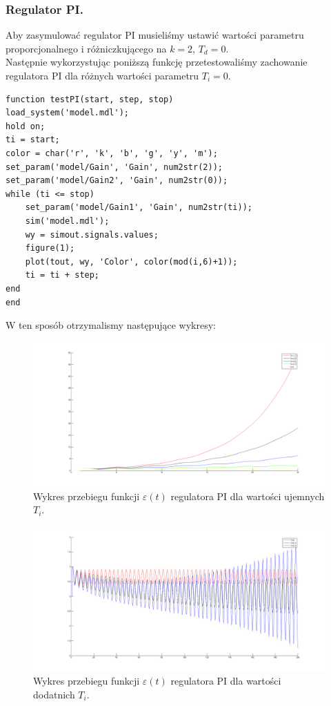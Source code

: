 \documentclass[a4paper,10pt]{article}
\begin{document}
\subsubsection{Regulator PI.}\label{sec:regPI}
Aby zasymulować regulator PI musieliśmy ustawić wartości parametru proporcjonalnego i różniczkującego na $k=2$, $T_{d}=0$. \\
Następnie wykorzystując poniższą funkcję przetestowaliśmy zachowanie regulatora PI dla różnych wartości parametru $T_{i}=0$. \\
\begin{lstlisting}[caption=Funkcja testująca regulator PI.]
function testPI(start, step, stop)
load_system('model.mdl');
hold on;
ti = start;
color = char('r', 'k', 'b', 'g', 'y', 'm');
set_param('model/Gain', 'Gain', num2str(2));
set_param('model/Gain2', 'Gain', num2str(0));
while (ti <= stop)
    set_param('model/Gain1', 'Gain', num2str(ti));
    sim('model.mdl');
    wy = simout.signals.values;
    figure(1);
    plot(tout, wy, 'Color', color(mod(i,6)+1));
    ti = ti + step;
end
end
\end{lstlisting}
W ten sposób otrzymalismy następujące wykresy: \\
\begin{figure}[!h]
    \centering
	\includegraphics[width=130mm]{CW2-regulatorPI-eu.png}
	\caption{Wykres przebiegu funkcji $\varepsilon(t)$ regulatora PI dla wartości ujemnych $T_{i}$.}
    \label{fig:regulatorPIeu}
\end{figure}
\begin{figure}[!h]
    \centering
	\includegraphics[width=130mm]{CW2-regulatorPI-ed.png}
	\caption{Wykres przebiegu funkcji $\varepsilon(t)$ regulatora PI dla wartości dodatnich $T_{i}$.}
    \label{fig:regulatorPIed}
\end{figure}
\end{document}
